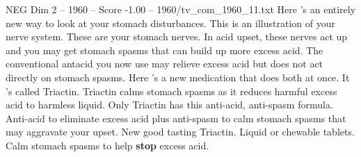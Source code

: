 \begin{textsample}{NEG Dim 2 – 1960 – Score -1.00 – 1960/tv\_com\_1960\_11.txt}  \label{ex:f2_neg_079}
Here 's an entirely new way to look at your stomach disturbances.
This is an illustration of your nerve system.
These are your stomach nerves.
In acid upset, these nerves act up and you may get stomach spasms that can build up more excess acid.
The conventional antacid you now use may relieve excess acid but does not act directly on stomach spasms.
Here 's a new medication that does both at once.
It 's called Triactin.
Triactin calms stomach spasms as it reduces harmful excess acid to harmless liquid.
Only Triactin has this anti-acid, anti-spasm formula.
Anti-acid to eliminate excess acid plus anti-spasm to calm stomach spasms that may aggravate your upset.
New good tasting Triactin.
Liquid or chewable tablets.
Calm stomach spasms to help \textbf{stop} excess acid.

\end{textsample}
